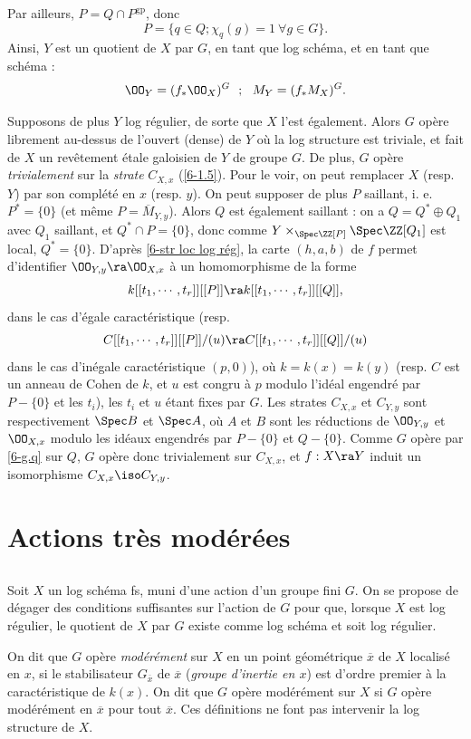 \documentclass[10pt]{../fichiers-configuration-latex/smfart}
\begin{document}
Par ailleurs, $P = Q \cap P^{\mathrm{gp}}$, donc $$ P = \{q \in Q ; \chi_q(g) = 1 \  \forall g \in G
\}.  $$ Ainsi, $Y$ est un quotient de $X$ par $G$, en tant que log schéma, et en tant que schéma :
$$ \OO_Y = (f_*\OO_X)^G \ \ ; \ \ M_Y = (f_*M_X)^G.  $$

Supposons de plus $Y$ log régulier, de sorte que $X$ l'est également. Alors $G$ opère librement
au-dessus de l'ouvert (dense) de $Y$ où la log structure est triviale, et fait de $X$ un revêtement
étale galoisien de $Y$ de groupe $G$. De plus, $G$ opère \textit{trivialement} sur la
\textit{strate} $C_{X,x}$ (\ref{6-1.5}). Pour le voir, on peut remplacer $X$ (resp. $Y$) par son
complété en $x$ (resp. $y$). On peut supposer de plus $P$ saillant, i. e.  $P^* = \{0\}$ (et même $P
= \overline{M}_{Y,y}$). Alors $Q$ est également saillant : on a $Q = Q^* \oplus Q_1$ avec $Q_1$
saillant, et $Q^* \cap P = \{0\}$, donc comme $Y \times_{\Spec \ZZ [P]} \Spec \ZZ [Q_1]$ est local, $Q^*
= \{0\}$.  D'après \ref{6-str loc log rég}, la carte $(h,a,b)$ de $f$ permet d'identifier
$\OO_{Y,y} \ra \OO_{X,x}$ à un homomorphisme de la forme $$ k[[t_1,\cdots,t_r]][[P]]
\ra k[[t_1,\cdots,t_r]][[Q]], $$ dans le cas d'égale caractéristique (resp.  $$
C[[t_1,\cdots,t_r]][[P]]/(u) \ra C[[t_1,\cdots,t_r]][[Q]]/(u) $$ dans le cas d'inégale
caractéristique $(p,0)$), où $k = k(x)  = k(y)$ (resp. $C$ est un anneau de Cohen de $k$, et $u$ est
congru à $p$ modulo l'idéal engendré par $P - \{0\}$ et les $t_i$), les $t_i$ et $u$ étant fixes par
$G$. Les strates $C_{X,x}$  et $C_{Y,y}$ sont respectivement $\Spec B$ et $\Spec A$, où $A$ et $B$ sont
les réductions de $\OO_{Y,y}$ et $\OO_{X,x}$ modulo les idéaux engendrés par
$P-\{0\}$ et $Q - \{0\}$. Comme $G$ opère par \ref{6-g.q} sur $Q$, $G$ opère donc trivialement sur
$C_{X,x}$, et $f : X \ra Y$ induit un isomorphisme $C_{X,x} \iso C_{Y,y}$.  \section{Actions très
modérées} \subsection{}\label{6-3.1} Soit $X$ un log schéma fs, muni d'une action d'un groupe fini
$G$. On se propose de dégager des conditions suffisantes sur l'action de $G$ pour que, lorsque $X$
est log régulier, le quotient de $X$ par $G$ existe comme log schéma et soit log régulier. 

On dit que $G$ opère \textit{modérément} sur $X$ en un point géométrique $\overline{x}$ de $X$
localisé en $x$, si le stabilisateur $G_{\overline{x}}$ de $\overline{x}$ (\textit{groupe d'inertie
en $x$}) est d'ordre premier à la caractéristique de $k(x)$. On dit que $G$ opère modérément sur $X$
si $G$ opère modérément en $\overline{x}$ pour tout $\overline{x}$. Ces définitions ne font pas
intervenir la log structure de $X$.
\end{document}
